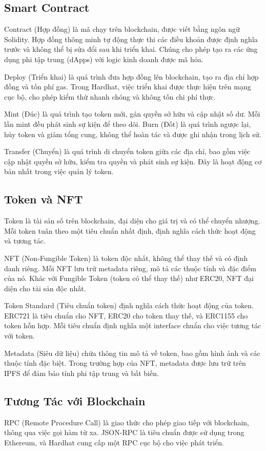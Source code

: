 \subsection{Smart Contract}
Contract (Hợp đồng) là mã chạy trên blockchain, được viết bằng ngôn ngữ Solidity. Hợp đồng thông minh tự động thực thi các điều khoản được định nghĩa trước và không thể bị sửa đổi sau khi triển khai. Chúng cho phép tạo ra các ứng dụng phi tập trung (dApps) với logic kinh doanh được mã hóa.

Deploy (Triển khai) là quá trình đưa hợp đồng lên blockchain, tạo ra địa chỉ hợp đồng và tốn phí gas. Trong Hardhat, việc triển khai được thực hiện trên mạng cục bộ, cho phép kiểm thử nhanh chóng và không tốn chi phí thực.

Mint (Đúc) là quá trình tạo token mới, gán quyền sở hữu và cập nhật số dư. Mỗi lần mint đều phát sinh sự kiện để theo dõi. Burn (Đốt) là quá trình ngược lại, hủy token và giảm tổng cung, không thể hoàn tác và được ghi nhận trong lịch sử.

Transfer (Chuyển) là quá trình di chuyển token giữa các địa chỉ, bao gồm việc cập nhật quyền sở hữu, kiểm tra quyền và phát sinh sự kiện. Đây là hoạt động cơ bản nhất trong việc quản lý token.

\subsection{Token và NFT}
Token là tài sản số trên blockchain, đại diện cho giá trị và có thể chuyển nhượng. Mỗi token tuân theo một tiêu chuẩn nhất định, định nghĩa cách thức hoạt động và tương tác.

NFT (Non-Fungible Token) là token độc nhất, không thể thay thế và có định danh riêng. Mỗi NFT lưu trữ metadata riêng, mô tả các thuộc tính và đặc điểm của nó. Khác với Fungible Token (token có thể thay thế) như ERC20, NFT đại diện cho tài sản độc nhất.

Token Standard (Tiêu chuẩn token) định nghĩa cách thức hoạt động của token. ERC721 là tiêu chuẩn cho NFT, ERC20 cho token thay thế, và ERC1155 cho token hỗn hợp. Mỗi tiêu chuẩn định nghĩa một interface chuẩn cho việc tương tác với token.

Metadata (Siêu dữ liệu) chứa thông tin mô tả về token, bao gồm hình ảnh và các thuộc tính đặc biệt. Trong trường hợp của NFT, metadata được lưu trữ trên IPFS để đảm bảo tính phi tập trung và bất biến.

\subsection{Tương Tác với Blockchain}
RPC (Remote Procedure Call) là giao thức cho phép giao tiếp với blockchain, thông qua việc gọi hàm từ xa. JSON-RPC là tiêu chuẩn được sử dụng trong Ethereum, và Hardhat cung cấp một RPC cục bộ cho việc phát triển.

